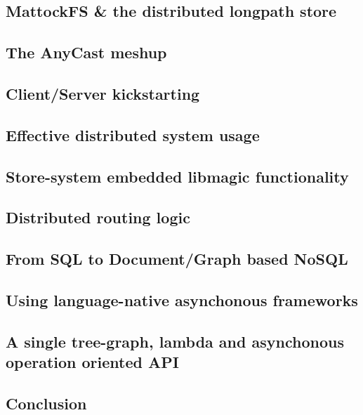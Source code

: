 \subsection{MattockFS \& the distributed longpath store}
\subsection{The AnyCast meshup}
\subsection{Client/Server kickstarting}
\subsection{Effective distributed system usage}
\subsection{Store-system embedded libmagic functionality}
\subsection{Distributed routing logic}
\subsection{From SQL to Document/Graph based NoSQL}
\subsection{Using language-native asynchonous frameworks}
\subsection{A single tree-graph, lambda and asynchonous operation oriented API}
\subsection{Conclusion}
